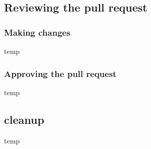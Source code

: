 \documentclass[a4paper, titlepage]{article}
\begin{document}
\subsection{Reviewing the pull request}
\label{BPRW_reviewing_pull_request}

	


\subsubsection{Making changes}
\label{BPRW_RPW_making_changes}
temp

\subsubsection{Approving the pull request}
\label{BPRW_RPW_approving_pull_request}
temp

\subsection{cleanup}
\label{BPRW_cleanup}
temp
\end{document}
